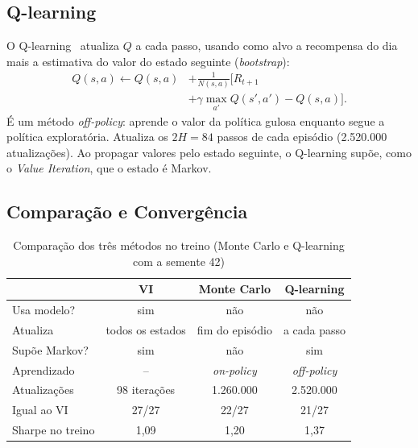 \documentclass[conference]{IEEEtran}
\begin{document}
\subsection{Q-learning}

O Q-learning~\cite{watkins1992} atualiza $Q$ a cada passo, usando como alvo a recompensa do dia mais a estimativa do valor do estado seguinte (\textit{bootstrap}):
\begin{align}
  Q(s,a) \leftarrow Q(s,a) &+ \frac{1}{N(s,a)} \Big[R_{t+1} \nonumber \\
                           &+ \gamma \max_{a'} Q(s',a') - Q(s,a)\Big].
\end{align}
É um método \textit{off-policy}: aprende o valor da política gulosa enquanto segue a política exploratória. Atualiza os $2H = 84$ passos de cada episódio (2.520.000 atualizações). Ao propagar valores pelo estado seguinte, o Q-learning supõe, como o \textit{Value Iteration}, que o estado é Markov.

\subsection{Comparação e Convergência}

\begin{table}[!t]
  \centering
  \caption{Comparação dos três métodos no treino (Monte Carlo e Q-learning com a semente 42)}
  \label{tab:metodos}
  \footnotesize
  \setlength{\tabcolsep}{4pt}
  \renewcommand{\arraystretch}{1.1}
  \begin{tabular}{l ccc}
    \toprule
    & \textbf{VI} & \textbf{Monte Carlo} & \textbf{Q-learning} \\
    \midrule
    Usa modelo?       & sim                 & não             & não \\
    Atualiza          & todos os estados    & fim do episódio & a cada passo \\
    Supõe Markov?     & sim                 & não             & sim \\
    Aprendizado       & --                  & \textit{on-policy} & \textit{off-policy} \\
    Atualizações      & 98 iterações        & 1.260.000       & 2.520.000 \\
    Igual ao VI       & 27/27               & 22/27           & 21/27 \\
    Sharpe no treino  & 1,09                & 1,20            & 1,37 \\
    \bottomrule
  \end{tabular}
\end{table}
\end{document}
